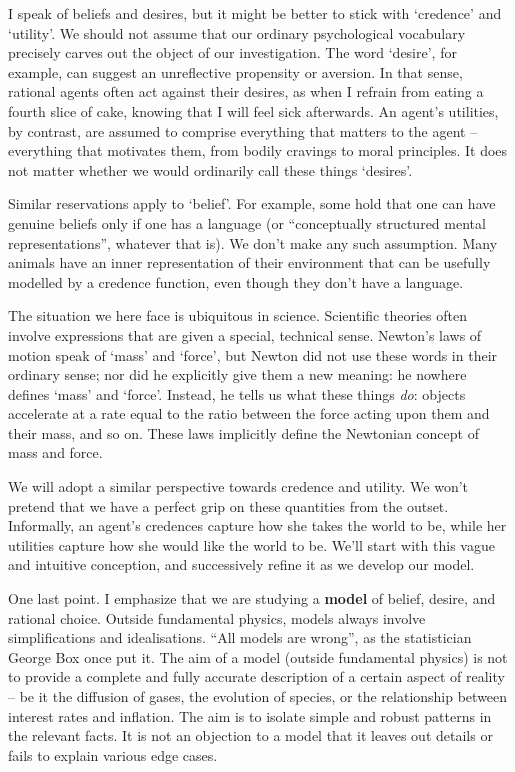 I speak of beliefs and desires, but it might be better to stick with `credence'
and `utility'. We should not assume that our ordinary psychological vocabulary
precisely carves out the object of our investigation. The word `desire', for
example, can suggest an unreflective propensity or aversion. In that sense,
rational agents often act against their desires, as when I refrain from eating a
fourth slice of cake, knowing that I will feel sick afterwards. An agent's
utilities, by contrast, are assumed to comprise everything that matters to the
agent -- everything that motivates them, from bodily cravings to moral
principles. It does not matter whether we would ordinarily call these things
`desires'.

Similar reservations apply to `belief'. For example, some hold that one can have
genuine beliefs only if one has a language (or ``conceptually structured mental
representations'', whatever that is). We don't make any such assumption. Many
animals have an inner representation of their environment that can be usefully
modelled by a credence function, even though they don't have a language.


The situation we here face is ubiquitous in science. Scientific theories often
involve expressions that are given a special, technical sense. Newton's laws of
motion speak of `mass' and `force', but Newton did not use these words in their
ordinary sense; nor did he explicitly give them a new meaning: he nowhere
defines `mass' and `force'. Instead, he tells us what these things \emph{do}:
objects accelerate at a rate equal to the ratio between the force acting upon
them and their mass, and so on. These laws implicitly define the Newtonian
concept of mass and force.

We will adopt a similar perspective towards credence and utility. We won't
pretend that we have a perfect grip on these quantities from the outset.
Informally, an agent's credences capture how she takes the world to be, while
her utilities capture how she would like the world to be. We'll start with this
vague and intuitive conception, and successively refine it as we
develop our model.

One last point. I emphasize that we are studying a \textbf{model} of belief,
desire, and rational choice. Outside fundamental physics, models always involve
simplifications and idealisations. ``All models are wrong'', as
the statistician George Box once put it. The aim of a model (outside fundamental
physics) is not to provide a complete and fully accurate description of a
certain aspect of reality -- be it the diffusion of gases, the evolution of
species, or the relationship between interest rates and inflation. The aim is to
isolate simple and robust patterns in the relevant facts. It is not an
objection to a model that it leaves out details or fails to explain various edge
cases.


